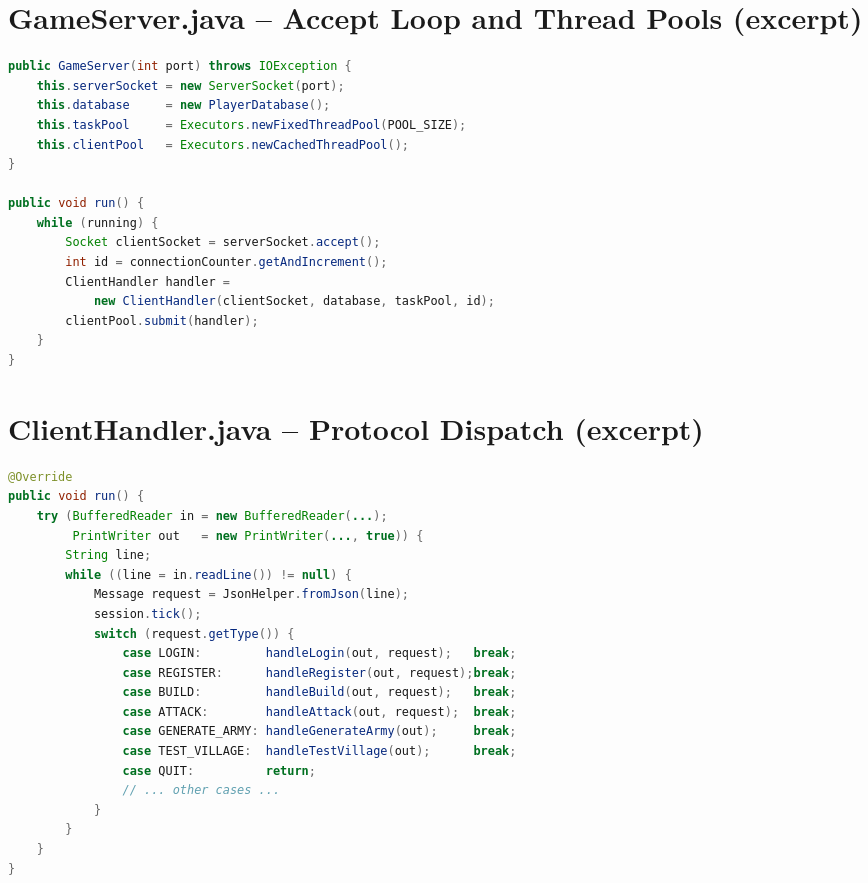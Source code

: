 \documentclass[format=acmsmall, review=false, screen=true]{acmart}
\begin{document}



\appendix

\section{GameServer.java -- Accept Loop and Thread Pools (excerpt)}
\begin{spacing}{0.8}
\begin{lstlisting}[language=Java]
public GameServer(int port) throws IOException {
    this.serverSocket = new ServerSocket(port);
    this.database     = new PlayerDatabase();
    this.taskPool     = Executors.newFixedThreadPool(POOL_SIZE);
    this.clientPool   = Executors.newCachedThreadPool();
}

public void run() {
    while (running) {
        Socket clientSocket = serverSocket.accept();
        int id = connectionCounter.getAndIncrement();
        ClientHandler handler =
            new ClientHandler(clientSocket, database, taskPool, id);
        clientPool.submit(handler);
    }
}
\end{lstlisting}
\end{spacing}

\clearpage

\section{ClientHandler.java -- Protocol Dispatch (excerpt)}
\begin{spacing}{0.8}
\begin{lstlisting}[language=Java]
@Override
public void run() {
    try (BufferedReader in = new BufferedReader(...);
         PrintWriter out   = new PrintWriter(..., true)) {
        String line;
        while ((line = in.readLine()) != null) {
            Message request = JsonHelper.fromJson(line);
            session.tick();
            switch (request.getType()) {
                case LOGIN:         handleLogin(out, request);   break;
                case REGISTER:      handleRegister(out, request);break;
                case BUILD:         handleBuild(out, request);   break;
                case ATTACK:        handleAttack(out, request);  break;
                case GENERATE_ARMY: handleGenerateArmy(out);     break;
                case TEST_VILLAGE:  handleTestVillage(out);      break;
                case QUIT:          return;
                // ... other cases ...
            }
        }
    }
}
\end{lstlisting}
\end{spacing}
\end{document}
